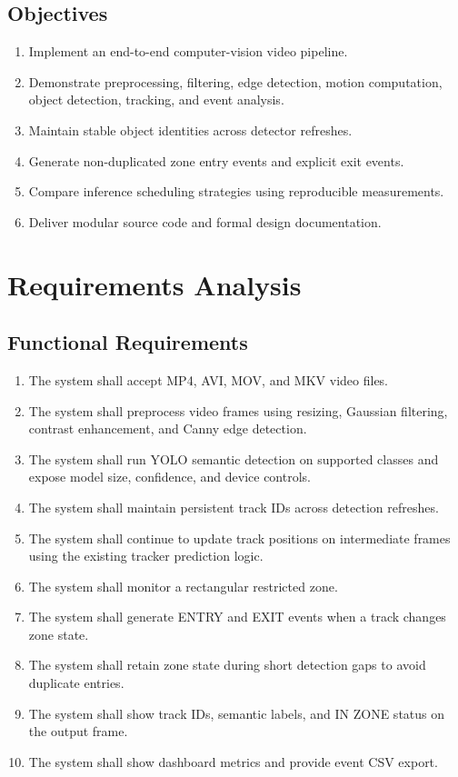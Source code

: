\documentclass[12pt,a4paper]{report}
\begin{document}
\section{Objectives}
\begin{enumerate}[leftmargin=*]
  \item Implement an end-to-end computer-vision video pipeline.
  \item Demonstrate preprocessing, filtering, edge detection, motion computation, object detection, tracking, and event analysis.
  \item Maintain stable object identities across detector refreshes.
  \item Generate non-duplicated zone entry events and explicit exit events.
  \item Compare inference scheduling strategies using reproducible measurements.
  \item Deliver modular source code and formal design documentation.
\end{enumerate}

\chapter{Requirements Analysis}
\section{Functional Requirements}
\begin{enumerate}[leftmargin=*]
  \item The system shall accept MP4, AVI, MOV, and MKV video files.
  \item The system shall preprocess video frames using resizing, Gaussian filtering, contrast enhancement, and Canny edge detection.
  \item The system shall run YOLO semantic detection on supported classes and expose model size, confidence, and device controls.
  \item The system shall maintain persistent track IDs across detection refreshes.
  \item The system shall continue to update track positions on intermediate frames using the existing tracker prediction logic.
  \item The system shall monitor a rectangular restricted zone.
  \item The system shall generate ENTRY and EXIT events when a track changes zone state.
  \item The system shall retain zone state during short detection gaps to avoid duplicate entries.
  \item The system shall show track IDs, semantic labels, and IN ZONE status on the output frame.
  \item The system shall show dashboard metrics and provide event CSV export.
\end{enumerate}
\end{document}
